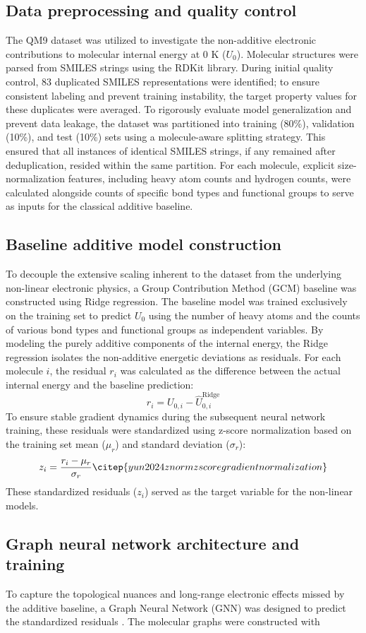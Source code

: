 \documentclass[]{article}
\begin{document}
\subsection{Data preprocessing and quality control}The QM9 dataset was utilized to investigate the non-additive electronic contributions to molecular internal energy at 0 K ($U_0$). Molecular structures were parsed from SMILES strings using the RDKit library. During initial quality control, 83 duplicated SMILES representations were identified; to ensure consistent labeling and prevent training instability, the target property values for these duplicates were averaged. To rigorously evaluate model generalization and prevent data leakage, the dataset was partitioned into training (80\%), validation (10\%), and test (10\%) sets using a molecule-aware splitting strategy. This ensured that all instances of identical SMILES strings, if any remained after deduplication, resided within the same partition. For each molecule, explicit size-normalization features, including heavy atom counts and hydrogen counts, were calculated alongside counts of specific bond types and functional groups to serve as inputs for the classical additive baseline.\subsection{Baseline additive model construction}To decouple the extensive scaling inherent to the dataset from the underlying non-linear electronic physics, a Group Contribution Method (GCM) baseline was constructed using Ridge regression. The baseline model was trained exclusively on the training set to predict $U_0$ using the number of heavy atoms and the counts of various bond types and functional groups as independent variables. By modeling the purely additive components of the internal energy, the Ridge regression isolates the non-additive energetic deviations as residuals. For each molecule $i$, the residual $r_i$ was calculated as the difference between the actual internal energy and the baseline prediction:\begin{equation}    r_i = U_{0,i} - \hat{U}_{0,i}^{\text{Ridge}}\end{equation}To ensure stable gradient dynamics during the subsequent neural network training, these residuals were standardized using z-score normalization based on the training set mean ($\mu_r$) and standard deviation ($\sigma_r$):\begin{equation}    z_i = \frac{r_i - \mu_r}{\sigma_r} \citep{yun2024znormzscoregradientnormalization}\end{equation}These standardized residuals ($z_i$) served as the target variable for the non-linear models.\subsection{Graph neural network architecture and training}To capture the topological nuances and long-range electronic effects missed by the additive baseline, a Graph Neural Network (GNN) was designed to predict the standardized residuals \citep{gilmer2017neuralmessagepassingquantum,ma2020multiviewgraphneuralnetworks}. The molecular graphs were constructed with 
\end{document}
